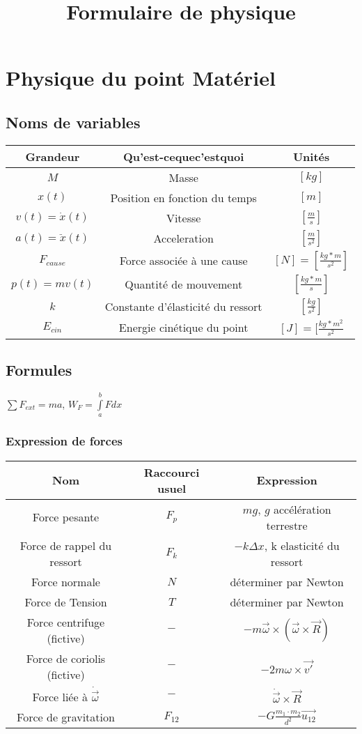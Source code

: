 \documentclass[10pt,a4paper]{article}
\title{Formulaire de physique}
\begin{document}
\section{Physique du point Matériel}

\subsection{Noms de variables}

\begin{tabular}{|c|c|c|}
\hline 
Grandeur & Qu'est-cequec'estquoi & Unités \\ 
\hline 
$M$ & Masse & $[kg]$ \\
\hline
$x(t)$ & Position en fonction du temps & $[m]$ \\ 
\hline
$v(t) = \dot{x}(t)$ & Vitesse & $[\frac{m}{s}]$ \\
\hline

$a(t) = \ddot{x}(t)$ & Acceleration & $[\frac{m}{s^2}]$ \\

\hline
$F_{cause}$ & Force associée à une cause & $[N] = [\frac{kg*m}{s^2}]$ \\
\hline
$p(t) = mv(t)$ & Quantité de mouvement & $[\frac{kg*m}{s}]$ \\
\hline
$k$ & Constante d'élasticité du ressort & $[\frac{kg}{s^2}]$\\
\hline
$E_{cin}$ & Energie cinétique du point & $[J] = [\frac{kg*m^2}{s^2}$ \\
\hline
\end{tabular}

\subsection{Formules}


$\sum F_{ext} = ma$, $W_F = \int\limits_a^b F dx$

\subsubsection{Expression de forces}

\begin{tabular}{c|c|c}
Nom & Raccourci usuel & Expression \\
\hline
Force pesante & $F_p$ & $mg$, $g$ accélération terrestre \\
Force de rappel du ressort & $F_k$ & $-k\Delta x$, k elasticité du ressort\\
Force normale & $N$ & déterminer par Newton \\
Force de Tension & $T$ & déterminer par Newton \\
Force centrifuge (fictive) & $-$ & $-m\vec\omega \times (\vec\omega \times \vec R)$ \\
Force de coriolis (fictive) & $-$ & $-2m\omega \times \vec{v'}$ \\
Force liée à $\dot{\vec{\omega}}$ & $-$ & $\dot{\vec{\omega}} \times \vec R$ \\
Force de gravitation & $F_{12}$ & $-G\frac{m_1 \cdot m_2}{d^2}\vec{u_{12}}$ \\
\end{tabular}
\end{document}
